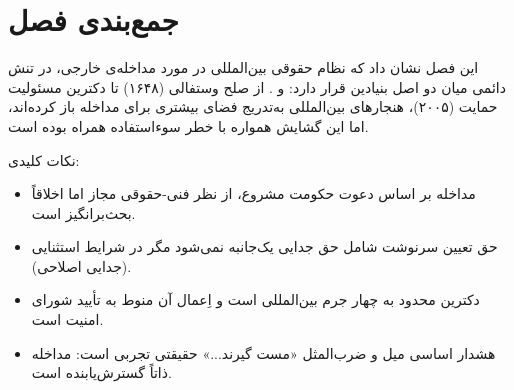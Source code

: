 \section{جمع‌بندی فصل}
\label{sec:ch02-summary}

این فصل نشان داد که نظام حقوقی بین‌المللی در مورد مداخله‌ی خارجی، در تنش دائمی میان دو اصل بنیادین قرار دارد:  و . از صلح وستفالی (۱۶۴۸) تا دکترین مسئولیت حمایت (۲۰۰۵)، هنجارهای بین‌المللی به‌تدریج فضای بیشتری برای مداخله باز کرده‌اند، اما این گشایش همواره با خطر سوءاستفاده همراه بوده است.

نکات کلیدی:
\begin{itemize}[nosep, rightmargin=1em]
  \item مداخله بر اساس دعوت حکومت مشروع، از نظر فنی-حقوقی مجاز اما اخلاقاً بحث‌برانگیز است.
  \item حق تعیین سرنوشت شامل حق جدایی یک‌جانبه نمی‌شود مگر در شرایط استثنایی (جدایی اصلاحی).
  \item دکترین  محدود به چهار جرم بین‌المللی است و اِعمال آن منوط به تأیید شورای امنیت است.
  \item هشدار اساسی میل و ضرب‌المثل «مست گیرند...» حقیقتی تجربی است: مداخله ذاتاً گسترش‌یابنده است.
\end{itemize}

\cleardoublepage